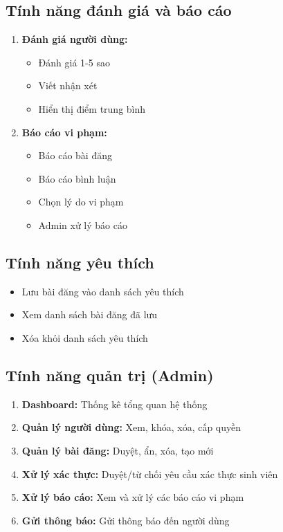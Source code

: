 \documentclass[a4paper,12pt]{article}
\begin{document}
\subsection{Tính năng đánh giá và báo cáo}

\begin{enumerate}
    \item \textbf{Đánh giá người dùng:}
    \begin{itemize}
        \item Đánh giá 1-5 sao
        \item Viết nhận xét
        \item Hiển thị điểm trung bình
    \end{itemize}
    
    \item \textbf{Báo cáo vi phạm:}
    \begin{itemize}
        \item Báo cáo bài đăng
        \item Báo cáo bình luận
        \item Chọn lý do vi phạm
        \item Admin xử lý báo cáo
    \end{itemize}
\end{enumerate}

\subsection{Tính năng yêu thích}

\begin{itemize}
    \item Lưu bài đăng vào danh sách yêu thích
    \item Xem danh sách bài đăng đã lưu
    \item Xóa khỏi danh sách yêu thích
\end{itemize}

\subsection{Tính năng quản trị (Admin)}

\begin{enumerate}
    \item \textbf{Dashboard:} Thống kê tổng quan hệ thống
    \item \textbf{Quản lý người dùng:} Xem, khóa, xóa, cấp quyền
    \item \textbf{Quản lý bài đăng:} Duyệt, ẩn, xóa, tạo mới
    \item \textbf{Xử lý xác thực:} Duyệt/từ chối yêu cầu xác thực sinh viên
    \item \textbf{Xử lý báo cáo:} Xem và xử lý các báo cáo vi phạm
    \item \textbf{Gửi thông báo:} Gửi thông báo đến người dùng
\end{enumerate}
\end{document}
